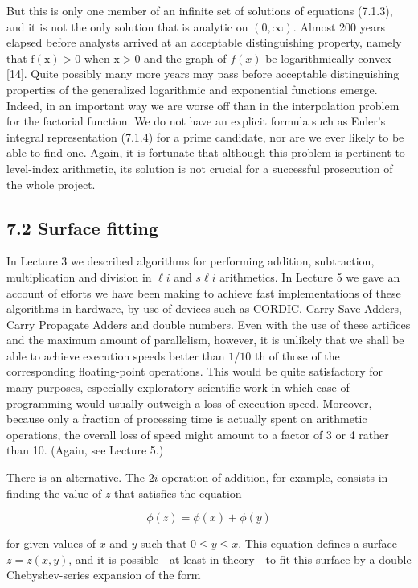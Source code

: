 \documentclass[10pt]{article}
\begin{document}
But this is only one member of an infinite set of solutions of equations (7.1.3), and it is not the only solution that is analytic on $(0, \infty)$. Almost 200 years elapsed before analysts arrived at an acceptable distinguishing property, namely that $\mathrm{f}(\mathrm{x})>0$ when $\mathrm{x}>0$ and the graph of $f(x)$ be logarithmically convex [14]. Quite possibly many more years may pass before acceptable distinguishing properties of the generalized logarithmic and exponential functions emerge. Indeed, in an important way we are worse off than in the interpolation problem for the factorial function. We do not have an explicit formula such as Euler's integral representation (7.1.4) for a prime candidate, nor are we ever likely to be able to find one. Again, it is fortunate that although this problem is pertinent to level-index arithmetic, its solution is not crucial for a successful prosecution of the whole project.

\subsection*{7.2 Surface fitting}
In Lecture 3 we described algorithms for performing addition, subtraction, multiplication and division in $\ell i$ and $s \ell i$ arithmetics. In Lecture 5 we gave an account of efforts we have been making to achieve fast implementations of these algorithms in hardware, by use of devices such as CORDIC, Carry Save Adders, Carry Propagate Adders and double numbers. Even with the use of these artifices and the maximum amount of parallelism, however, it is unlikely that we shall be able to achieve execution speeds better than $1 / 10$ th of those of the corresponding floating-point operations. This would be quite satisfactory for many purposes, especially exploratory scientific work in which ease of programming would usually outweigh a loss of execution speed. Moreover, because only a fraction of processing time is actually spent on arithmetic operations, the overall loss of speed might amount to a factor of 3 or 4 rather than 10. (Again, see Lecture 5.)

There is an alternative. The $2 i$ operation of addition, for example, consists in finding the value of $z$ that satisfies the equation

$$
\phi(z)=\phi(x)+\phi(y)
$$

for given values of $x$ and $y$ such that $0 \leqslant y \leqslant x$. This equation defines a surface $z=z(x, y)$, and it is possible - at least in theory - to fit this surface by a double Chebyshev-series expansion of the form
\end{document}
